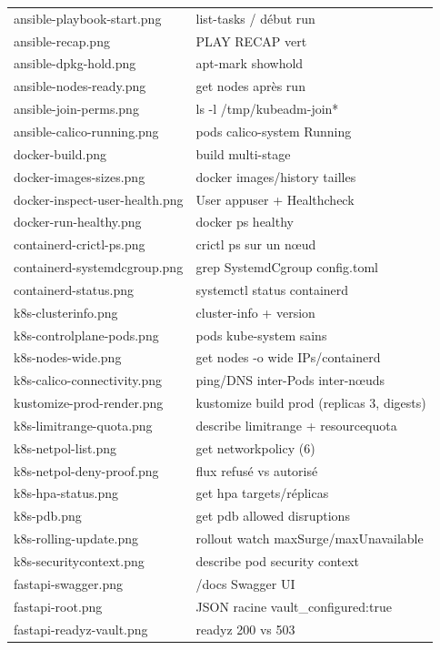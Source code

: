 \documentclass[12pt,a4paper]{article}
\begin{document}
{\begin{longtable}{@{}p{5.6cm}p{9.4cm}@{}}
ansible-playbook-start.png & list-tasks / début run \\
ansible-recap.png & PLAY RECAP vert \\
ansible-dpkg-hold.png & apt-mark showhold \\
ansible-nodes-ready.png & get nodes après run \\
ansible-join-perms.png & ls -l /tmp/kubeadm-join* \\
ansible-calico-running.png & pods calico-system Running \\
docker-build.png & build multi-stage \\
docker-images-sizes.png & docker images/history tailles \\
docker-inspect-user-health.png & User appuser + Healthcheck \\
docker-run-healthy.png & docker ps healthy \\
containerd-crictl-ps.png & crictl ps sur un nœud \\
containerd-systemdcgroup.png & grep SystemdCgroup config.toml \\
containerd-status.png & systemctl status containerd \\
k8s-clusterinfo.png & cluster-info + version \\
k8s-controlplane-pods.png & pods kube-system sains \\
k8s-nodes-wide.png & get nodes -o wide IPs/containerd \\
k8s-calico-connectivity.png & ping/DNS inter-Pods inter-nœuds \\
kustomize-prod-render.png & kustomize build prod (replicas 3, digests) \\
k8s-limitrange-quota.png & describe limitrange + resourcequota \\
k8s-netpol-list.png & get networkpolicy (6) \\
k8s-netpol-deny-proof.png & flux refusé vs autorisé \\
k8s-hpa-status.png & get hpa targets/réplicas \\
k8s-pdb.png & get pdb allowed disruptions \\
k8s-rolling-update.png & rollout watch maxSurge/maxUnavailable \\
k8s-securitycontext.png & describe pod security context \\
fastapi-swagger.png & /docs Swagger UI \\
fastapi-root.png & JSON racine vault\_configured:true \\
fastapi-readyz-vault.png & readyz 200 vs 503 \\

\end{longtable}}
\end{document}
